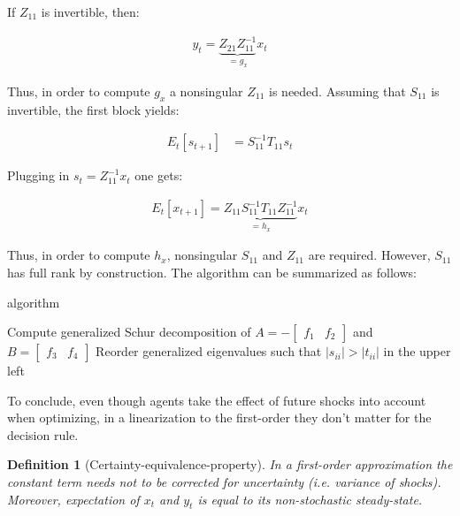 \documentclass{pracamgr}
\numberwithin{equation}{section}
\newtheorem{mydef}{Definition}
\begin{document}
If $Z_{11}$ is invertible, then:

\begin{align}
  y_t = \underbrace{Z_{21} Z_{11}^{-1}}_{=g_x} x_t
\end{align}

Thus, in order to compute $g_x$ a nonsingular $Z_{11}$ is needed. Assuming  that $S_{11}$ is invertible, the first block yields:

\begin{align}
   E_t[s_{t+1}] &= S_{11}^{-1} T_{11} s_t
\end{align}

Plugging in $s_t = Z_{11}^{-1} x_t$ one gets:

\begin{align}
   E_t[ x_{t+1}] = \underbrace{Z_{11} S_{11}^{-1} T_{11} Z_{11}^{-1}}_{=h_x} x_t
\end{align}

Thus, in order to compute $h_x$, nonsingular $S_{11}$ and $Z_{11}$ are required. However, $S_{11}$ has full rank by construction. The \citet{klein2000using} algorithm can be summarized as follows: \\

\begin{algorithm}[H]
\caption{\citet{klein2000using} algorithm}
Compute generalized Schur decomposition of $A=-\begin{bmatrix} f_1 & f_2\end{bmatrix}$ and $B=\begin{bmatrix} f_3 & f_4\end{bmatrix}$\;
Reorder generalized eigenvalues such that $|s_{ii}|>|t_{ii}|$ in the upper left\;
\end{algorithm}

\bigbreak

To conclude, even though agents take the effect of future shocks into account when optimizing, in a linearization to the first-order they don't matter for the decision rule.

\begin{mydef}[Certainty-equivalence-property]
     In a first-order approximation the constant term needs not to be corrected for uncertainty (i.e. variance of shocks). Moreover, expectation of $x_t$ and $y_t$ is equal to its non-stochastic steady-state.
\end{mydef}
\end{document}

